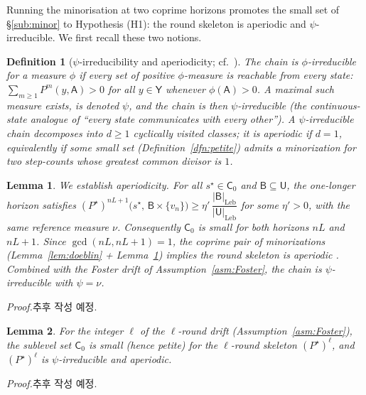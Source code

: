 \documentclass[11pt]{article}
\newtheorem{lem}{Lemma}
\newtheorem{dfn}{Definition}
\theoremstyle{definition}
\begin{document}
Running the minorisation at two coprime horizons promotes the small set of \S\ref{sub:minor} to Hypothesis (H1): the round skeleton is aperiodic and $\psi$-irreducible. We first recall these two notions.

\begin{dfn}[$\psi$-irreducibility and aperiodicity; cf.\ {\cite[\S4.2, \S5.4]{MeynTweedie2009}}]
\label{dfn:irr}
The chain is \emph{$\phi$-irreducible} for a measure $\phi$ if every set of positive $\phi$-measure is reachable from every state: $\sum_{m \geq 1} P^m(y, \mathsf{A}) > 0$ for all $y \in \mathsf{Y}$ whenever $\phi(\mathsf{A}) > 0$. A maximal such measure exists, is denoted $\psi$, and the chain is then \emph{$\psi$-irreducible} (the continuous-state analogue of ``every state communicates with every other''). A $\psi$-irreducible chain decomposes into $d \geq 1$ cyclically visited classes; it is \emph{aperiodic} if $d = 1$, equivalently if some small set (Definition~\ref{dfn:petite}) admits a minorization for two step-counts whose greatest common divisor is $1$.
\end{dfn}

\begin{lem}
\label{lem:doeblin-twin}
We establish aperiodicity. For all $s^{\star}\in \mathsf{C}_0$ and $\mathsf{B}\subseteq \mathsf{U}$, the one-longer horizon satisfies $(P^{\star})^{nL+1}\bigl(s^{\star},\, \mathsf{B}\times\{v_n\}\bigr)\geq\eta'\,\dfrac{|\mathsf{B}|_{\mathrm{Leb}}}{|\mathsf{U}|_{\mathrm{Leb}}}$ for some $\eta'>0$, with the same reference measure $\nu$. Consequently $\mathsf{C}_0$ is small for both horizons $nL$ and $nL+1$. Since $\gcd(nL, nL+1) = 1$, the coprime pair of minorizations (Lemma~\ref{lem:doeblin} + Lemma~\ref{lem:doeblin-twin}) implies the round skeleton is aperiodic \cite[\S5.4]{MeynTweedie2009}. Combined with the Foster drift of Assumption~\ref{asm:Foster}, the chain is $\psi$-irreducible \cite[\S4.2]{MeynTweedie2009} with $\psi = \nu$.
\end{lem}
\noindent\emph{Proof.}\quad 추후 작성 예정.

\begin{lem}
\label{lem:doeblin-kskeleton}
For the integer $\ell$ of the $\ell$-round drift (Assumption~\ref{asm:Foster}), the sublevel set $\mathsf{C}_0$ is small (hence petite) for the $\ell$-round skeleton $(P^{\star})^{\ell}$, and $(P^{\star})^{\ell}$ is $\psi$-irreducible and aperiodic.
\end{lem}
\noindent\emph{Proof.}\quad 추후 작성 예정.
\end{document}
